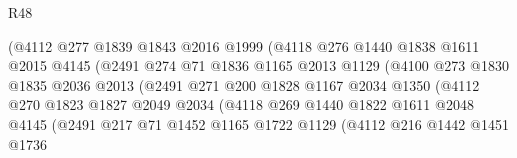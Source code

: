 \begin{lexlean}{R48}
\begin{coremodule}
                              (@4112
                                @277
                                @1839
                                @1843
                                @2016
                                @1999
                                (@4118
                                  @276
                                  @1440
                                  @1838
                                  @1611
                                  @2015
                                  @4145
                                  (@2491
                                    @274
                                    @71
                                    @1836
                                    @1165
                                    @2013
                                    @1129
                                    (@4100
                                      @273
                                      @1830
                                      @1835
                                      @2036
                                      @2013
                                      (@2491
                                        @271
                                        @200
                                        @1828
                                        @1167
                                        @2034
                                        @1350
                                        (@4112
                                          @270
                                          @1823
                                          @1827
                                          @2049
                                          @2034
                                          (@4118
                                            @269
                                            @1440
                                            @1822
                                            @1611
                                            @2048
                                            @4145
                                            (@2491
                                              @217
                                              @71
                                              @1452
                                              @1165
                                              @1722
                                              @1129
                                              (@4112
                                                @216
                                                @1442
                                                @1451
                                                @1736

\end{coremodule}
\end{lexlean}
